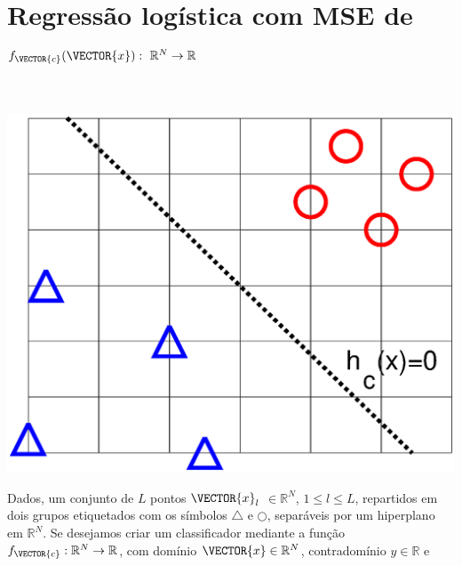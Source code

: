\newpage

\section{Regressão logística com MSE de $f_{\VECTOR{c}}(\VECTOR{x}):~\mathbb{R}^{N} \rightarrow \mathbb{R}$}




\begin{theorem}\label{theo:reglogrnr1:1}
~\\
\noindent
\begin{minipage}{0.45\textwidth}
\centering
\includegraphics[width=0.95\linewidth]{chapters/classificacao/mfiles/reglogrnr1/reglogrnr1.eps} 
\end{minipage}
\begin{minipage}{0.55\textwidth}
Dados, um conjunto de $L$ pontos
$\VECTOR{x}_l$ $\in \mathbb{R}^{N}$, $1\leq l \leq L$,
repartidos em dois grupos etiquetados com os símbolos $\bigtriangleup$ e $\bigcirc$,
separáveis por um hiperplano  em $\mathbb{R}^{N}$.
Se desejamos criar um classificador mediante 
a função  $f_{\VECTOR{c}}:\mathbb{R}^{N} \rightarrow \mathbb{R}$,
com domínio $\VECTOR{x} \in \mathbb{R}^{N}$, contradomínio $y \in \mathbb{R}$ e 

\end{minipage}
\end{theorem}
